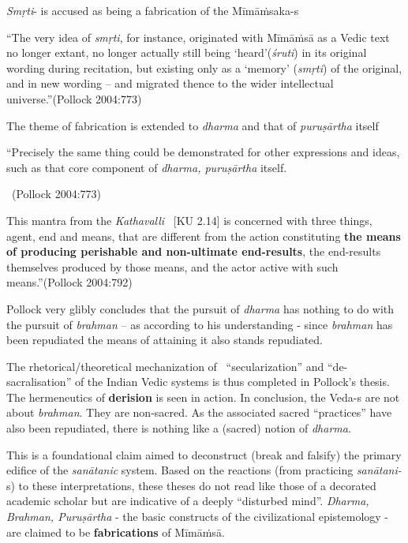 \textit{Smṛti}- is accused as being a fabrication of the Mīmāṁsaka-s

\begin{myquote}
“The very idea of \textit{smṛti}, for instance, originated with Mīmāṁsā as a Vedic text no longer extant, no longer actually still being ‘heard’(\textit{śruti}) in its original wording during recitation, but existing only as a ‘memory’ (\textit{smṛti}) of the original, and in new wording – and migrated thence to the wider intellectual universe.”\hfill (Pollock 2004:773)
\end{myquote}

The theme of fabrication is extended to \textit{dharma} and that of \textit{puruṣārtha} itself

\begin{myquote}
“Precisely the same thing could be demonstrated for other expressions and ideas, such as that core component of \textit{dharma, puruṣārtha} itself.

~\hfill (Pollock 2004:773)
\end{myquote}

\begin{myquote}
This mantra from the \textit{Kathavalli}  [KU 2.14] is concerned with three things, agent, end and means, that are different from the action constituting \textbf{the means of producing perishable and non-ultimate end-results}, the end-results themselves produced by those means, and the actor active with such means.”\hfill (Pollock 2004:792)
\end{myquote}

Pollock very glibly concludes that the pursuit of \textit{dharma} has nothing to do with the pursuit of \textit{brahman} – as according to his understanding - since \textit{brahman} has been repudiated the means of attaining it also stands repudiated.

The rhetorical/theoretical mechanization of  “secularization” and “de-sacralisation” of the Indian Vedic systems is thus completed in Pollock’s thesis. The hermeneutics of \textbf{derision} is seen in action. In conclusion, the Veda-s are not about \textit{brahman}. They are non-sacred. As the associated sacred “practices” have also been repudiated, there is nothing like a (sacred) notion of \textit{dharma}.

This is a foundational claim aimed to deconstruct (break and falsify) the primary edifice of the \textit{sanātanic} system. Based on the reactions (from practicing \textit{sanātani-}s) to these interpretations, these theses do not read like those of a decorated academic scholar but are indicative of a deeply “disturbed mind”. \textit{Dharma, Brahman, Puruṣārtha} - the basic constructs of the civilizational epistemology - are claimed to be \textbf{fabrications} of Mīmāṁsā.


